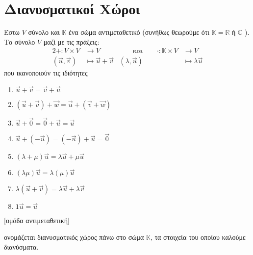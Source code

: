 







\chapter{Διανυσματικοί Χώροι}

\begin{dfn}
\item {}
	Έστω $V$ σύνολο και $\mathbb{K}$ ένα σώμα αντιμεταθετικό 
    (συνήθως θεωρούμε ότι $ \mathbb{K} = \mathbb{R} $ ή $\mathbb{C}$ ). 
    Το σύνολο $V$ μαζί με τις πράξεις:
	\begin{alignat*}{2}
        + \colon V \times V &\to V & \qquad \text{και} \qquad \cdot \colon \mathbb{K} 
        \times V &\to V \\ ( \vec{u}, \vec{v} ) &\mapsto \vec{u} + \vec{v} 
                 & ( \lambda, \vec{u} ) &\mapsto \lambda \vec{u} 
	\end{alignat*}
    \vspace{\baselineskip}
που ικανοποιούν τις ιδιότητες 

    \begin{minipage}{0.3\textwidth}
\begin{enumerate}
    \item $ \vec{u} + \vec{v} = \vec{v} + \vec{u} $ \hfill{}
	\item $ ( \vec{u} + \vec{v} ) + \vec{w} = \vec{u} + ( \vec{v} + \vec{w}) $ 
	\item $ \vec{u} + \vec{0} = \vec{0} + \vec{u} = \vec{u} $ 
	\item $ \vec{u} + ( - \vec{u} ) = ( - \vec{u} ) + \vec{u} = \vec{0} $ \hfill{}
	\item $ ( \lambda + \mu ) \vec{u} = \lambda \vec{u} + \mu \vec{u} $ 
	\item $ ( \lambda \mu ) \vec{u} = \lambda ( \mu) \vec{u} $ 
	\item $ \lambda ( \vec{u} + \vec{v} ) = \lambda \vec{u} + \lambda \vec{v} $ 
	\item $ 1 \vec{u} = \vec{u} $ 
\end{enumerate}
[ομάδα αντιμεταθετική]
\end{minipage}

ονομάζεται διανυσματικός χώρος πάνω στο σώμα $\mathbb{K}$, τα στοιχεία του οποίου
καλούμε διανύσματα.

\end{dfn}



